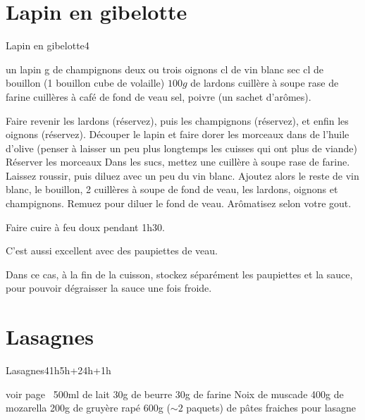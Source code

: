 {\section{Lapin en gibelotte}
\begin{recette}{Lapin en gibelotte}{4}{}{}
\begin{ingredients}
\ingredient un lapin
 g de champignons
\ingredient deux ou trois oignons
 cl de vin blanc sec
 cl de bouillon (1 bouillon cube de volaille)
\ingredient $100\unit{g}$ de lardons
 cuillère à soupe rase de farine
 cuillères à café de fond de veau
\ingredient sel, poivre (un sachet d'arômes).
\end{ingredients}

\begin{preparation}
\etape Faire revenir les lardons (réservez), puis les champignons (réservez), et enfin les oignons (réservez).
\etape Découper le lapin et faire dorer les morceaux dans de l'huile d'olive (penser à laisser un peu plus longtemps les cuisses 
qui ont plus de viande)
\etape Réserver les morceaux
\etape Dans les sucs, mettez une cuillère à soupe rase de farine. Laissez roussir, puis diluez avec un peu du vin blanc.
\etape Ajoutez alors le reste de vin blanc, le bouillon, 2 cuillères à soupe de fond de veau, les lardons, oignons et 
champignons. Remuez pour diluer le fond de veau.
\etape Arômatisez selon votre gout.
\end{preparation}

\begin{cuisson}
Faire cuire à feu doux pendant 1h30.

\begin{remarque}
C'est aussi excellent avec des paupiettes de veau.

Dans ce cas, à la fin de la cuisson, stockez séparément les paupiettes et la sauce, pour pouvoir dégraisser la sauce une fois 
froide.
\end{remarque}
\end{cuisson}
\end{recette}

\section{Lasagnes}
\begin{recette}{Lasagnes}{4}{1h}{5h+24h+1h}
\begin{ingredients}
\ingredient[bolognaise]
\ingredient voir page~\pageref{sec:bolognaise}
\ingredient[Béchamel]
\ingredient 500ml de lait
\ingredient 30g de beurre
\ingredient 30g de farine 
\ingredient Noix de muscade
\ingredient[lasagnes]
\ingredient 400g de mozarella
\ingredient 200g de gruyère rapé
\ingredient 600g ($\sim 2$ paquets) de pâtes fraiches pour lasagne
\end{ingredients}


\end{recette}}
